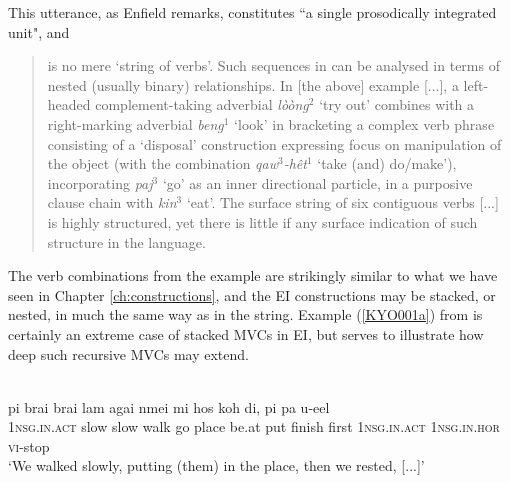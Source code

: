 This utterance, as Enfield remarks, constitutes ``a single prosodically integrated unit", and \begin{quote}is no mere `string of verbs'. Such sequences in  can be analysed in terms of nested (usually binary) relationships. In [the above] example [...], a left-headed complement-taking adverbial \textit{lòòng$^2$} `try out' combines with a right-marking adverbial \textit{beng$^1$} `look' in bracketing a complex verb phrase consisting of a `disposal' construction expressing focus on manipulation of the object (with the combination \textit{qaw$^3$-hêt$^1$} `take (and) do/make'), incorporating \textit{paj$^3$} `go' as an inner directional particle, in a purposive clause chain with \textit{kin$^3$} `eat'. The surface string of six contiguous verbs [...] is highly structured, yet there is little if any surface indication of such structure in the language. \citep[83]{enfield2008verbs}\end{quote}

The verb combinations from the  example are strikingly similar to what we have seen in Chapter \ref{ch:constructions}, and the EI constructions may be stacked, or nested, in much the same way as in the  string. Example (\ref{KYO001a}) from  is certainly an extreme case of stacked MVCs in EI, but serves to illustrate how deep such recursive MVCs may extend. 

\ea \label{KYO001a}
\\
\gll pi brai brai lam agai nmei mi hos koh di, pi pa u-eel\\
\textsc{1}\textsc{nsg}.\textsc{in}.\textsc{act} slow slow walk go place be.at put finish first \textsc{1}\textsc{nsg}.\textsc{in}.\textsc{act} \textsc{1}\textsc{nsg}.\textsc{in}.\textsc{hor} \textsc{vi}-stop\\
\glft `We walked slowly, putting (them) in the place, then we rested, [...]'\\ 
\z

